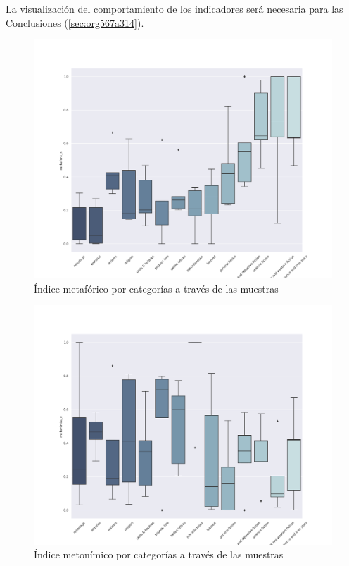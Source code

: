 \documentclass[12pt,letterpaper,twoside]{article}
\begin{document}
La visualización del comportamiento de los indicadores será necesaria para las Conclusiones (\ref{sec:org567a314}).

\begin{figure}[H]
\centering
\includegraphics[width=0.9\linewidth]{./resultados/graphs/total/accum_cat_metafora.png}
\caption{\label{fig:metafora_categorias} Índice metafórico por categorías a través de las muestras }
\end{figure}
\begin{figure}[H]
\centering
\includegraphics[width=0.9\linewidth]{./resultados/graphs/total/accum_cat_metonimia.png}
\caption{\label{fig:metonimia_categorias} Índice metonímico por categorías a través de las muestras  }
\end{figure}
\end{document}
